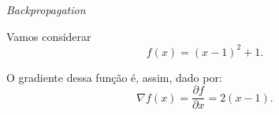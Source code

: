 \begin{frame}{\textit{Backpropagation} \cont}

    \begin{example}
        
        \medskip
        
        Vamos considerar 
        \begin{equation*}
            f(x) = (x - 1)^2 + 1.
        \end{equation*} 
        
        \medskip
        
        O gradiente dessa função é, assim, dado por:
        \begin{equation*}
            \nabla f(x) = \dfrac{\partial f}{\partial x} = 2 (x-1).
        \end{equation*}
        
        \begin{figure}
            \centering
            \resizebox{0.4\textwidth}{!}{
                
            }
        \end{figure}
        
    \end{example}

\end{frame}

